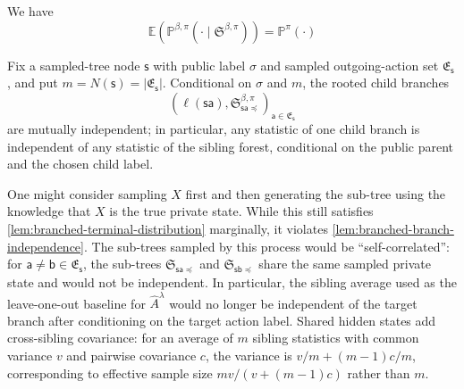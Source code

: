 \documentclass[12pt, a4paper]{article}
\begin{document}
\begin{lemma}\label{lem:branched-terminal-distribution}
    We have
    \begin{equation}\label{eq:branched-terminal-distribution}
        \mathbb{E}(\mathbb{P}^{\beta, \pi}(\cdot \mid \mathfrak{S}^{\beta, \pi})) = \mathbb{P}^\pi(\cdot)
    \end{equation}
\end{lemma}

\begin{lemma}\label{lem:branched-branch-independence}
    Fix a sampled-tree node $\mathsf{s}$ with public label $\sigma$ and sampled outgoing-action set $\mathfrak{E}_{\mathsf{s}}$, and put $m=N(\mathsf{s})=|\mathfrak{E}_{\mathsf{s}}|$.
    Conditional on $\sigma$ and $m$, the rooted child branches
    \[
        \left(\ell(\mathsf{s}\mathsf{a}),\mathfrak{S}_{\mathsf{s}\mathsf{a}\preccurlyeq}^{\beta,\pi}\right)_{\mathsf{a}\in\mathfrak{E}_{\mathsf{s}}}
    \]
    are mutually independent; in particular, any statistic of one child branch is independent of any statistic of the sibling forest, conditional on the public parent and the chosen child label.
\end{lemma}

\begin{warning}\label{warn:no-private-tilting}
    One might consider sampling $X$ first and then generating the sub-tree using the knowledge that $X$ is the true private state.
    While this still satisfies \autoref{lem:branched-terminal-distribution} marginally, it violates \autoref{lem:branched-branch-independence}.
    The sub-trees sampled by this process would be ``self-correlated'': for $\mathsf{a}\neq\mathsf{b}\in \mathfrak{E}_{\mathsf{s}}$, the sub-trees $\mathfrak{S}_{\mathsf{s}\mathsf{a} \preccurlyeq}$ and $\mathfrak{S}_{\mathsf{s}\mathsf{b} \preccurlyeq}$ share the same sampled private state and would not be independent.
    In particular, the sibling average used as the leave-one-out baseline for $\widehat{A}^\lambda$ would no longer be independent of the target branch after conditioning on the target action label.
    Shared hidden states add cross-sibling covariance: for an average of $m$ sibling statistics with common variance $v$ and pairwise covariance $c$, the variance is $v/m+(m-1)c/m$, corresponding to effective sample size $mv/(v+(m-1)c)$ rather than $m$.
\end{warning}
\end{document}
